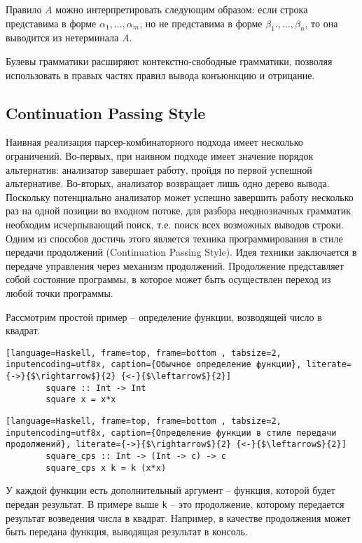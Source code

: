 Правило $A$ можно интерпретировать следующим образом: если строка представима в форме $\alpha_1 ,...,\alpha_m$, но не представима в форме $\beta_1 .,...,\beta_n$, то она выводится из нетерминала $A$.

Булевы грамматики расширяют контекстно-свободные грамматики, позволяя использовать в правых частях правил вывода конъюнкцию и отрицание.

    \subsection{Continuation Passing Style}
    Наивная реализация парсер-комбинаторного подхода имеет несколько ограничений. Во-первых, при наивном подходе имеет значение порядок альтернатив: анализатор завершает работу, пройдя по первой успешной альтернативе. Во-вторых, анализатор возвращает лишь одно дерево вывода. Поскольку потенциально анализатор может успешно завершить работу несколько раз на одной позиции во входном потоке, для разбора неоднозначных грамматик необходим исчерпывающий поиск, т.е. поиск всех возможных выводов строки. Одним из способов достичь этого является техника программирования в стиле передачи продолжений (Continuation Passing Style). Идея техники заключается в передаче управления через механизм продолжений. Продолжение представляет собой состояние программы, в которое может быть осуществлен переход из любой точки программы.
    
    Рассмотрим простой пример -- определение функции, возводящей число в квадрат. 
    
        \begin{lstlisting}[language=Haskell, frame=top, frame=bottom , tabsize=2, inputencoding=utf8x, caption={Обычное определение функции}, literate={->}{$\rightarrow$}{2} {<-}{$\leftarrow$}{2}]
        square :: Int -> Int
        square x = x*x
        \end{lstlisting}

        \begin{lstlisting}[language=Haskell, frame=top, frame=bottom , tabsize=2, inputencoding=utf8x, caption={Определение функции в стиле передачи продолжений}, literate={->}{$\rightarrow$}{2} {<-}{$\leftarrow$}{2}]
        square_cps :: Int -> (Int -> c) -> c
        square_cps x k = k (x*x)
        \end{lstlisting}
        
    У каждой функции есть дополнительный аргумент -- функция, которой будет передан результат. В примере выше \lstinline[language=Haskell]{k} -- это продолжение, которому передается результат возведения числа в квадрат. Например, в качестве продолжения может быть передана функция, выводящая результат в консоль.
        
